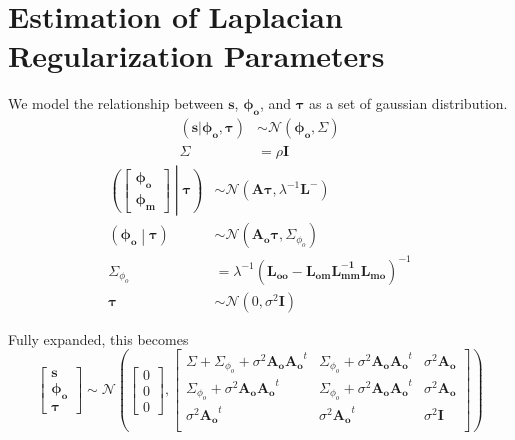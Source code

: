 \section{Estimation of Laplacian Regularization Parameters}\label{sec:laplacian_regularization_parameter_estimation}
    We model the relationship between $\mathbf{s}$, $\mathbf{\phi_o}$, and
    $\mathbf{\tau}$ as a set of gaussian distribution.
    \begin{align}
        \left(\mathbf{s}|\mathbf{\phi_o}, \mathbf{\tau}\right) &\sim
            \mathcal{N}(\mathbf{\phi_o}, \Sigma)\\
        \Sigma &= \rho\mathbf{I}
    \end{align}
    \begin{align}
        \left(\begin{bmatrix}
            \mathbf{\phi_o}\\
            \mathbf{\phi_m}
        \end{bmatrix}\middle|\mathbf{\tau}\right) &\sim
            \mathcal{N}(\mathbf{A\tau}, \lambda^{-1}\mathbf{L}^-)\\
        \left(\mathbf{\phi_o}\middle|\mathbf{\tau}\right) &\sim
            \mathcal{N}\left(\mathbf{A_o}\mathbf{\tau}, \Sigma_{\phi_o}\right)\\
        \Sigma_{\phi_o} &= \lambda^{-1}\left(
            \mathbf{L_{oo}} - \mathbf{L_{om}L_{mm}^{-1}L_{mo}}\right)^{-1}\\
        \mathbf{\tau} &\sim \mathcal{N}\left(0, \sigma^2\mathbf{I}\right)
    \end{align}

    \noindent Fully expanded, this becomes
    \begin{equation}
        \begin{bmatrix}
            \mathbf{s}\\
            \mathbf{\phi_o}\\
            \mathbf{\tau}
        \end{bmatrix} \sim \mathcal{N}\left(
            \begin{bmatrix}0\\0\\0\end{bmatrix},
            \begin{bmatrix}
                \Sigma + \Sigma_{\phi_o} + \sigma^2\mathbf{A_oA_o}^t &
                \Sigma_{\phi_o} + \sigma^2\mathbf{A_oA_o}^t &
                \sigma^2\mathbf{A_o}\\
                \Sigma_{\phi_o} + \sigma^2\mathbf{A_oA_o}^t &
                \Sigma_{\phi_o} + \sigma^2\mathbf{A_oA_o}^t &
                \sigma^2\mathbf{A_o}\\
                \sigma^2\mathbf{A_o}^t & \sigma^2\mathbf{A_o}^t & \sigma^2\mathbf{I}\\
            \end{bmatrix}
        \right)\label{eqn:multivariate_gaussian_model}
    \end{equation}


